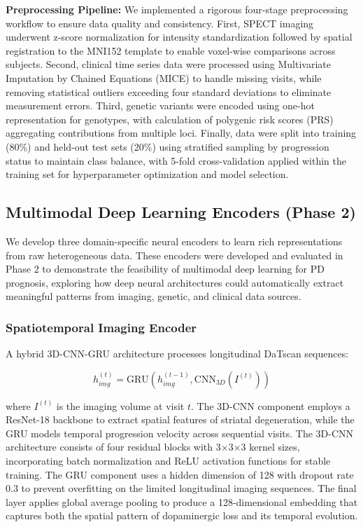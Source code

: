 \documentclass[conference]{IEEEtran}
\begin{document}
\textbf{Preprocessing Pipeline:} We implemented a rigorous four-stage preprocessing workflow to ensure data quality and consistency. First, SPECT imaging underwent z-score normalization for intensity standardization followed by spatial registration to the MNI152 template to enable voxel-wise comparisons across subjects. Second, clinical time series data were processed using Multivariate Imputation by Chained Equations (MICE) to handle missing visits, while removing statistical outliers exceeding four standard deviations to eliminate measurement errors. Third, genetic variants were encoded using one-hot representation for genotypes, with calculation of polygenic risk scores (PRS) aggregating contributions from multiple loci. Finally, data were split into training (80\%) and held-out test sets (20\%) using stratified sampling by progression status to maintain class balance, with 5-fold cross-validation applied within the training set for hyperparameter optimization and model selection.


\subsection{Multimodal Deep Learning Encoders (Phase 2)}

We develop three domain-specific neural encoders to learn rich representations from raw heterogeneous data. These encoders were developed and evaluated in Phase 2 to demonstrate the feasibility of multimodal deep learning for PD prognosis, exploring how deep neural architectures could automatically extract meaningful patterns from imaging, genetic, and clinical data sources.

\subsubsection{Spatiotemporal Imaging Encoder}
A hybrid 3D-CNN-GRU architecture processes longitudinal DaTscan sequences:

\begin{equation}
h_{img}^{(t)} = \text{GRU}(h_{img}^{(t-1)}, \text{CNN}_{3D}(I^{(t)}))
\end{equation}

where $I^{(t)}$ is the imaging volume at visit $t$. The 3D-CNN component employs a ResNet-18 backbone to extract spatial features of striatal degeneration, while the GRU models temporal progression velocity across sequential visits. The 3D-CNN architecture consists of four residual blocks with 3×3×3 kernel sizes, incorporating batch normalization and ReLU activation functions for stable training. The GRU component uses a hidden dimension of 128 with dropout rate 0.3 to prevent overfitting on the limited longitudinal imaging sequences. The final layer applies global average pooling to produce a 128-dimensional embedding that captures both the spatial pattern of dopaminergic loss and its temporal evolution.
\end{document}
